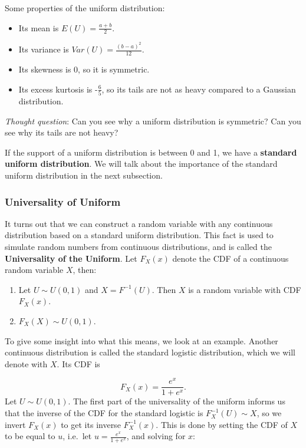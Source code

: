 \documentclass[
]{book}
\providecommand{\tightlist}{%
  \setlength{\itemsep}{0pt}\setlength{\parskip}{0pt}}
\begin{document}
Some properties of the uniform distribution:

\begin{itemize}
\tightlist
\item
  Its mean is \(E(U) = \frac{a+b}{2}\).
\item
  Its variance is \(Var(U) = \frac{(b-a)^2}{12}\).
\item
  Its skewness is 0, so it is symmetric.
\item
  Its excess kurtosis is -\(\frac{6}{5}\), so its tails are not as heavy compared to a Gaussian distribution.
\end{itemize}

\emph{Thought question}: Can you see why a uniform distribution is symmetric? Can you see why its tails are not heavy?

If the support of a uniform distribution is between 0 and 1, we have a \textbf{standard uniform distribution}. We will talk about the importance of the standard uniform distribution in the next subsection.

\hypertarget{universality-of-uniform}{%
\subsubsection{Universality of Uniform}\label{universality-of-uniform}}

It turns out that we can construct a random variable with any continuous distribution based on a standard uniform distribution. This fact is used to simulate random numbers from continuous distributions, and is called the \textbf{Universality of the Uniform}. Let \(F_X(x)\) denote the CDF of a continuous random variable \(X\), then:

\begin{enumerate}
\def\labelenumi{\arabic{enumi}.}
\tightlist
\item
  Let \(U \sim U(0,1)\) and \(X = F^{-1}(U)\). Then \(X\) is a random variable with CDF \(F_X(x)\).
\item
  \(F_X(X) \sim U(0,1)\).
\end{enumerate}

To give some insight into what this means, we look at an example. Another continuous distribution is called the standard logistic distribution, which we will denote with \(X\). Its CDF is

\[
F_X(x) = \frac{e^x}{1+e^x}.
\]
Let \(U \sim U(0,1)\). The first part of the universality of the uniform informs us that the inverse of the CDF for the standard logistic is \(F_X^{-1}(U) \sim X\), so we invert \(F_X(x)\) to get its inverse \(F_X^{-1}(x)\). This is done by setting the CDF of \(X\) to be equal to \(u\), i.e.~let \(u = \frac{e^x}{1+e^x}\), and solving for \(x\):
\end{document}
